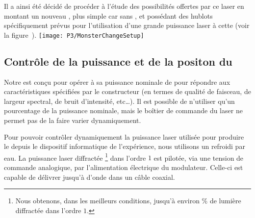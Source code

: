 Il a ainsi été décidé de procéder à l'étude des possibilités offertes par ce laser en montant un nouveau \setup, plus simple car sans \gm, et possédant des hublots spécifiquement prévus pour l'utilisation d'une grande puissance laser à cette \lo (voir la figure~).
%
\bfighs
\texttt{[image: P3/MonsterChangeSetup]}
\label{fig:ChangeSetup}
\efigh

\subsection{Contrôle de la puissance et de la positon du \fld}
Notre \lyb est conçu pour opérer à sa puissance nominale de  pour répondre aux caractéristiques spécifiées par le constructeur (en termes de qualité de faisceau, de largeur spectral, de bruit d'intensité, etc\ldots).
Il est possible de n'utiliser qu'un pourcentage de la puissance nominale, mais le boîtier de commande du laser ne permet pas de la faire varier dynamiquement.

Pour pouvoir contrôler dynamiquement la puissance laser utilisée pour produire le \pd depuis le dispositif informatique de l'expérience, nous utilisons un \aom refroidi par eau. La puissance laser diffractée%
\footnote{Nous obtenons, dans les meilleurs conditions, jusqu'à environ \% de lumière diffractée dans l'ordre $1$.}
 dans l'ordre $1$ est pilotée, via une tension de commande analogique, par l'alimentation électrique du modulateur. Celle-ci est capable de délivrer jusqu'à  d'onde \rf dans un câble coaxial. 





